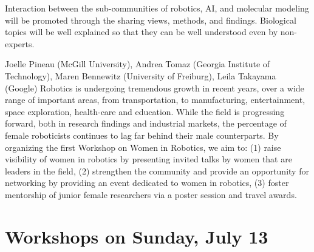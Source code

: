 \begin{spacing}{1.0}
{Interaction between the sub-communities of robotics, AI, and molecular modeling will be promoted through the sharing views, methods, and findings. Biological topics will be well explained so that they can be well understood even by non-experts.
}



{Joelle Pineau (McGill University), Andrea Tomaz (Georgia Institute of Technology), Maren Bennewitz (University of Freiburg), Leila Takayama (Google)}
{
Robotics is undergoing tremendous growth in recent years, over a wide range of important areas, from transportation, to manufacturing, entertainment, space exploration, health-care and education. While the field is progressing forward, both in research findings and industrial markets, the percentage of female roboticists continues to lag far behind their male counterparts. By organizing the first Workshop on Women in Robotics, we aim to: (1) raise visibility of women in robotics by presenting invited talks by women that are leaders in the field, (2) strengthen the community and provide an opportunity for networking by providing an event dedicated to women in robotics, (3) foster mentorship of junior female researchers via a poster session and travel awards.
}


\chapter{Workshops on Sunday, July 13}
\vspace*{-1.0cm}


\end{spacing}

